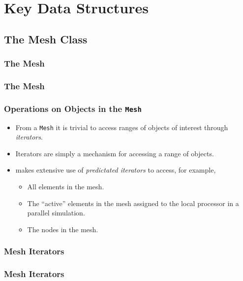 \section{Key Data Structures}

\subsection{The Mesh Class}
\begin{frame}[shrink]
  \frametitle{The Mesh}
  
\end{frame}

\begin{frame}[shrink]
  \frametitle{The Mesh}
  
\end{frame}

\begin{frame}
  \frametitle{Operations on Objects in the \texttt{Mesh}}
  \begin{block}{}
    \begin{itemize}
    \item From a \texttt{Mesh} it is trivial to access ranges of objects of interest through \emph{iterators}.
    \item Iterators are simply a mechanism for accessing a range of objects.
    \item \libMesh{} makes extensive use of \emph{predictated iterators} to access, for example,
      \begin{itemize}
        \item All elements in the mesh.
        \item The ``active'' elements in the mesh assigned to the local processor in a parallel simulation.
        \item The nodes in the mesh.
      \end{itemize}
  \end{itemize}
  \end{block}
\end{frame}

\begin{frame}[shrink]
  \frametitle{Mesh Iterators}
  
\end{frame}

\begin{frame}[shrink]
  \frametitle{Mesh Iterators}
  
\end{frame}



